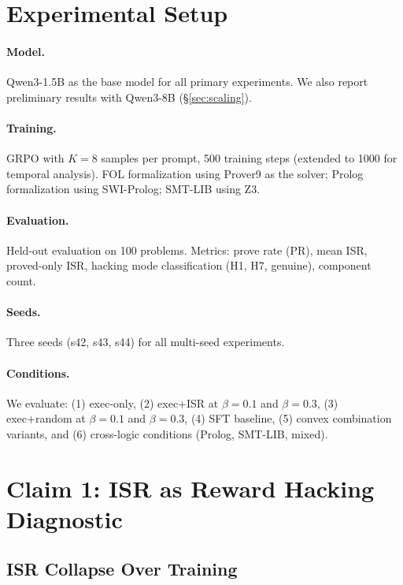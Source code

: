 \documentclass[11pt,a4paper]{article}
\newcommand{\ISR}{\textsc{ISR}}
\newcommand{\GRPO}{\textsc{GRPO}}
\begin{document}
\section{Experimental Setup}
\label{sec:setup}

\paragraph{Model.} Qwen3-1.5B as the base model for all primary experiments. We also report preliminary results with Qwen3-8B (\S\ref{sec:scaling}).

\paragraph{Training.} \GRPO{} with $K{=}8$ samples per prompt, 500 training steps (extended to 1000 for temporal analysis). FOL formalization using Prover9 as the solver; Prolog formalization using SWI-Prolog; SMT-LIB using Z3.

\paragraph{Evaluation.} Held-out evaluation on 100 problems. Metrics: prove rate (PR), mean \ISR{}, proved-only \ISR{}, hacking mode classification (H1, H7, genuine), component count.

\paragraph{Seeds.} Three seeds (s42, s43, s44) for all multi-seed experiments.

\paragraph{Conditions.} We evaluate: (1) exec-only, (2) exec+ISR at $\beta{=}0.1$ and $\beta{=}0.3$, (3) exec+random at $\beta{=}0.1$ and $\beta{=}0.3$, (4) SFT baseline, (5) convex combination variants, and (6) cross-logic conditions (Prolog, SMT-LIB, mixed).

\section{Claim 1: \ISR{} as Reward Hacking Diagnostic}
\label{sec:claim1}

\subsection{\ISR{} Collapse Over Training}
\end{document}
